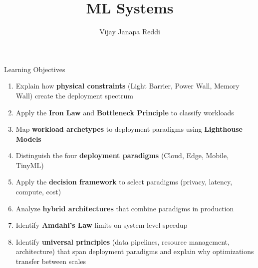 \documentclass[aspectratio=169, 12pt]{beamer}
\title{ML Systems}
\author{Vijay Janapa Reddi}
\institute{Harvard University}
\date{}
\begin{document}

\begin{frame}{Learning Objectives}
\note{
%
%
%
}

\footnotesize
\begin{enumerate}\setlength\itemsep{0pt}
  \item Explain how \textbf{physical constraints} (Light Barrier, Power Wall, Memory Wall) create the deployment spectrum
  \item Apply the \textbf{Iron Law} and \textbf{Bottleneck Principle} to classify workloads
  \item Map \textbf{workload archetypes} to deployment paradigms using \textbf{Lighthouse Models}
  \item Distinguish the four \textbf{deployment paradigms} (Cloud, Edge, Mobile, TinyML)
  \item Apply the \textbf{decision framework} to select paradigms (privacy, latency, compute, cost)
  \item Analyze \textbf{hybrid architectures} that combine paradigms in production
  \item Identify \textbf{Amdahl's Law} limits on system-level speedup
  \item Identify \textbf{universal principles} (data pipelines, resource management, architecture) that span deployment paradigms and explain why optimizations transfer between scales
\end{enumerate}

\end{frame}
\end{document}
